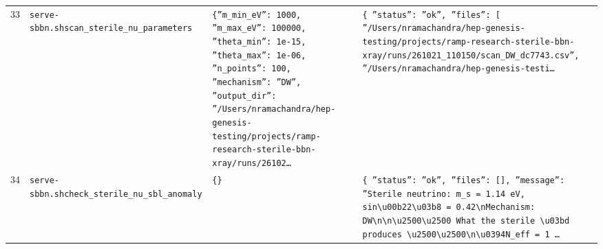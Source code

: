 \documentclass[11pt,a4paper]{article}
\begin{document}
\begin{longtable}{@{}p{}p{}p{}p{}@{}}
33 & \texttt{serve-sbbn.sh}\newline\texttt{scan\_\allowbreak{}sterile\_\allowbreak{}nu\_\allowbreak{}parameters} & \texttt{\{''m\_\allowbreak{}min\_\allowbreak{}eV'':\allowbreak{} 1000,\allowbreak{} ''m\_\allowbreak{}max\_\allowbreak{}eV'':\allowbreak{} 100000,\allowbreak{} ''theta\_\allowbreak{}min'':\allowbreak{} 1e-15,\allowbreak{} ''theta\_\allowbreak{}max'':\allowbreak{} 1e-06,\allowbreak{} ''n\_\allowbreak{}points'':\allowbreak{} 100,\allowbreak{} ''mechanism'':\allowbreak{} ''DW'',\allowbreak{} ''output\_\allowbreak{}dir'':\allowbreak{} ''/\allowbreak{}Users/\allowbreak{}nramachandra/\allowbreak{}hep-genesis-testing/\allowbreak{}projects/\allowbreak{}ramp-research-sterile-bbn-xray/\allowbreak{}runs/\allowbreak{}26102\ldots{}\allowbreak{}} & \texttt{\{   ''status'':\allowbreak{} ''ok'',\allowbreak{}   ''files'':\allowbreak{} [     ''/\allowbreak{}Users/\allowbreak{}nramachandra/\allowbreak{}hep-genesis-testing/\allowbreak{}projects/\allowbreak{}ramp-research-sterile-bbn-xray/\allowbreak{}runs/\allowbreak{}261021\_\allowbreak{}110150/\allowbreak{}scan\_\allowbreak{}DW\_\allowbreak{}dc7743.csv'',\allowbreak{}     ''/\allowbreak{}Users/\allowbreak{}nramachandra/\allowbreak{}hep-genesis-testi\ldots{}\allowbreak{}} \\
34 & \texttt{serve-sbbn.sh}\newline\texttt{check\_\allowbreak{}sterile\_\allowbreak{}nu\_\allowbreak{}sbl\_\allowbreak{}anomaly} & \texttt{\{\}\allowbreak{}} & \texttt{\{   ''status'':\allowbreak{} ''ok'',\allowbreak{}   ''files'':\allowbreak{} []\allowbreak{},\allowbreak{}   ''message'':\allowbreak{} ''Sterile neutrino:\allowbreak{} m\_\allowbreak{}s =\allowbreak{} 1.14 eV,\allowbreak{} sin\textbackslash{}\allowbreak{}u00b22\textbackslash{}\allowbreak{}u03b8 =\allowbreak{} 0.42\textbackslash{}\allowbreak{}nMechanism:\allowbreak{} DW\textbackslash{}\allowbreak{}n\textbackslash{}\allowbreak{}n\textbackslash{}\allowbreak{}u2500\textbackslash{}\allowbreak{}u2500 What the sterile \textbackslash{}\allowbreak{}u03bd produces \textbackslash{}\allowbreak{}u2500\textbackslash{}\allowbreak{}u2500\textbackslash{}\allowbreak{}n\textbackslash{}\allowbreak{}u0394N\_\allowbreak{}eff =\allowbreak{} 1 \ldots{}\allowbreak{}} \\

\end{longtable}
\end{document}
